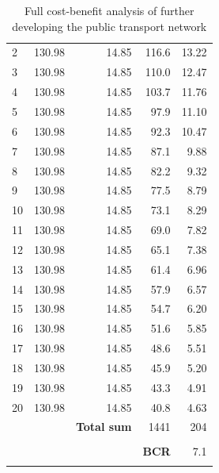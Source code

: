 \documentclass[twoside, a4paper, 11pt]{article}
\begin{document}
\begin{table}[H]
{\begin{tabular}{|l|r|r|r|r|}
2  & 130.98 & 14.85 & 116.6 & 13.22 \\
3  & 130.98 & 14.85 & 110.0 & 12.47 \\
4  & 130.98 & 14.85 & 103.7 & 11.76 \\
5  & 130.98 & 14.85 & 97.9  & 11.10 \\
6  & 130.98 & 14.85 & 92.3  & 10.47 \\
7  & 130.98 & 14.85 & 87.1  & 9.88  \\
8  & 130.98 & 14.85 & 82.2  & 9.32  \\
9  & 130.98 & 14.85 & 77.5  & 8.79  \\
10 & 130.98 & 14.85 & 73.1  & 8.29  \\
11 & 130.98 & 14.85 & 69.0  & 7.82  \\
12 & 130.98 & 14.85 & 65.1  & 7.38  \\
13 & 130.98 & 14.85 & 61.4  & 6.96  \\
14 & 130.98 & 14.85 & 57.9  & 6.57  \\
15 & 130.98 & 14.85 & 54.7  & 6.20  \\
16 & 130.98 & 14.85 & 51.6  & 5.85  \\
17 & 130.98 & 14.85 & 48.6  & 5.51  \\
18 & 130.98 & 14.85 & 45.9  & 5.20  \\
19 & 130.98 & 14.85 & 43.3  & 4.91  \\
20 & 130.98 & 14.85 & 40.8  & 4.63  \\
&&\textbf{Total sum}& 1441   &204\\
&&&&\\
&&&\cellcolor{green}\textbf{BCR}&\cellcolor{green}7.1\\
\Xhline{2\arrayrulewidth}
\end{tabular}
}
\caption{Full cost-benefit analysis of further developing the public transport network}
\label{bcadptn}
\end{table}

\newpage
\end{document}
